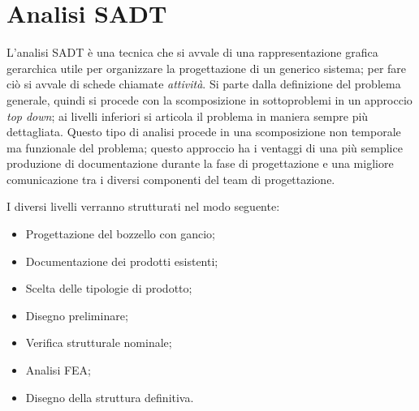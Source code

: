 \section{Analisi SADT}

L'analisi SADT è una tecnica che si avvale di una rappresentazione grafica gerarchica utile per organizzare la progettazione di un generico sistema; per fare ciò si avvale di schede chiamate \textit{attività}.
Si parte dalla definizione del problema generale, quindi si procede con la scomposizione in sottoproblemi in un approccio \textit{top down}; ai livelli inferiori si articola il problema in maniera sempre più dettagliata.
Questo tipo di analisi procede in una scomposizione non temporale ma funzionale del problema; questo approccio ha i ventaggi di una più semplice produzione di documentazione durante la fase di progettazione e una migliore comunicazione tra i diversi componenti del team di progettazione.

I diversi livelli verranno strutturati nel modo seguente:
\begin{itemize}
\item Progettazione del bozzello con gancio;
\item Documentazione dei prodotti esistenti;
\item Scelta delle tipologie di prodotto;
\item Disegno preliminare;
\item Verifica strutturale nominale;
\item Analisi FEA;
\item Disegno della struttura definitiva. 
\end{itemize}

